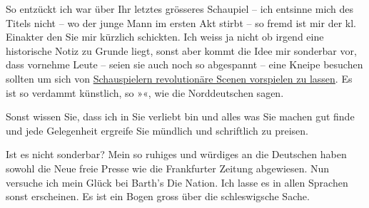 \pstart
           So entzückt ich war über Ihr letztes grösseres Schaupiel – ich entsinne mich des Titels nicht – wo der
               junge Mann im ersten Akt stirbt – so fremd ist mir der kl. Einakter den Sie mir kürzlich schickten.
               Ich weiss ja nicht ob irgend eine historische Notiz zu Grunde liegt, sonst aber kommt
               die Idee mir sonderbar vor, dass vornehme Leute – seien sie auch noch so abgespannt –
               eine Kneipe besuchen sollten um sich von \uline{Schauspielern
                  revolutionäre Scenen vorspielen zu lassen}. Es ist so verdammt künstlich, so
                  »\label{K_L00905-1v}\label{K_L00905-1}«, wie die Norddeutschen
               sagen.\pend
           
\pstart
           Sonst wissen Sie, dass ich in Sie verliebt bin und alles was Sie machen {\pb}gut finde und jede Gelegenheit
               ergreife Sie mündlich und schriftlich zu preisen.\pend
           
\pstart
           Ist es nicht sonderbar? Mein so ruhiges und würdiges \label{K_L00905-2v}\label{K_L00905-2} an die Deutschen haben
               sowohl die Neue freie Presse wie die Frankfurter Zeitung abgewiesen. Nun versuche ich
               mein Glück bei Barth’s Die Nation. Ich lasse es in allen Sprachen sonst erscheinen. Es
               ist ein Bogen gross über die schleswigsche
               Sache.\pend
           

